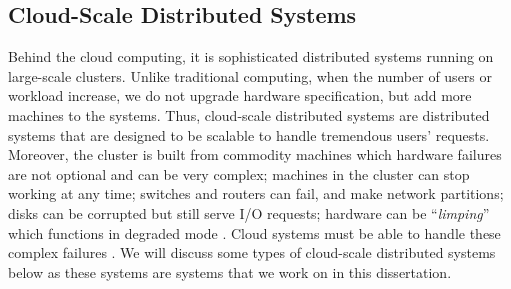 \subsection{Cloud-Scale Distributed Systems}

Behind the cloud computing, it is sophisticated distributed systems running on
large-scale clusters. Unlike traditional computing, when the number of users or
workload increase, we do not upgrade hardware specification, but add more
machines to the systems. Thus, cloud-scale distributed systems are distributed
systems that are designed to be scalable to handle tremendous users' requests.
Moreover, the cluster is built from commodity machines which hardware failures
are not optional and can be very complex; machines in the cluster can stop
working at any time; switches and routers can fail, and make network partitions;
disks can be corrupted but still serve I/O requests; hardware can be
``\textit{limping}'' which functions in degraded mode \cite{Do+13-Limplock,
Suminto+15-Spv}. Cloud systems must be able to handle these complex failures
\cite{Abadi09-Cloud, Gunawi+11-FaaS-TR, Hamilton07-Deploying}. We will discuss
some types of cloud-scale distributed systems below as these systems are systems
that we work on in this dissertation.

